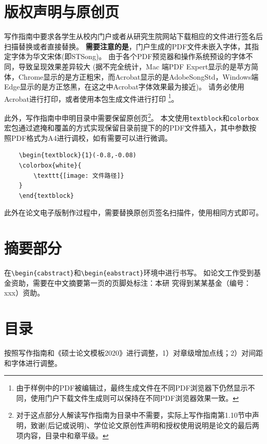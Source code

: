 \section{版权声明与原创页}
\label{sec:copy-origin}

写作指南中要求各学生从校内门户或者从研究生院网站下载相应的文件进行签名后扫描替换或者直接替换。
\textbf{需要注意的是}，门户生成的PDF文件未嵌入字体，其指定字体为华文宋体(即STSong)。
由于各个PDF预览器和操作系统预设的字体不同，导致呈现效果差异较大
(据不完全统计，Mac 端PDF Expert显示的是苹方简体，Chrome显示的是方正粗宋，而Acrobat显示的是AdobeSongStd，Windows端Edge显示的是方正悠黑，在这之中Acrobat字体效果最为接近)。
请务必使用Acrobat进行打印，或者使用本包生成文件进行打印
\footnote{由于样例中的PDF被编辑过，最终生成文件在不同PDF浏览器下仍然显示不同，使用门户下载文件生成则可以保持在不同PDF浏览器效果一致。}。

此外，写作指南中申明目录中需要保留原创页\footnote{对于这点部分人解读写作指南为目录中不需要，实际上写作指南第1.10节中声明，致谢(后记或说明)、学位论文原创性声明和授权使用说明是论文的最后两项内容，目录中和章平级。}。
本文使用\verb|textblock|和\verb|colorbox|宏包通过遮掩和覆盖的方式实现保留目录前提下的的PDF文件插入，其中参数按照PDF格式为A4进行调校，如有需要可以进行微调。

\begin{Verbatim}
    \begin{textblock}{1}(-0.8,-0.08)
    \colorbox{white}{
        \texttt{[image: 文件路径]}
    }
    \end{textblock}
\end{Verbatim}

此外在论文电子版制作过程中，需要替换原创页签名扫描件，使用相同方式即可。

\section{摘要部分}
\label{sec:abstract}

在\verb|\begin{cabstract}|和\verb|\begin{eabstract}|环境中进行书写。
如论文工作受到基金资助，需要在中文摘要第一页的页脚处标注：本研 究得到某某基金（编号：xxx）资助。

\section{目录}
\label{sec:directory}

按照写作指南和《硕士论文模板2020》进行调整，1）对章级增加点线；2）对间距和字体进行调整。

